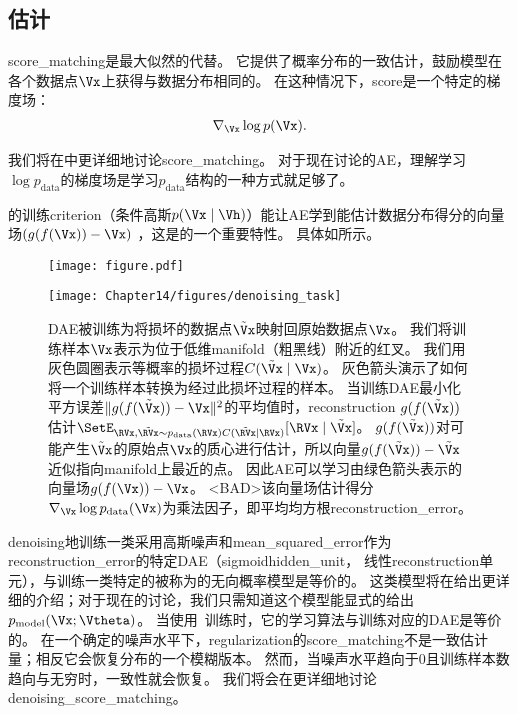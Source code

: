 
\subsection{估计}
\label{sec:estimating_the_score}
\gls{score_matching}\citep{Hyvarinen-2005}是最大似然的代替。
它提供了概率分布的一致估计，鼓励模型在各个数据点$\Vx$上获得与数据分布相同的。
在这种情况下，\gls{score}是一个特定的梯度场：
\begin{align}
 \nabla_{\Vx} \log p(\Vx) .
\end{align}

我们将在中更详细地讨论\gls{score_matching}。
对于现在讨论的\gls{AE}，理解学习$\log p_{\text{data}}$的梯度场是学习$p_{\text{data}}$结构的一种方式就足够了。


的训练\gls{criterion}（条件高斯$p(\Vx \mid \Vh)$）能让\gls{AE}学到能估计数据分布得分的向量场$(g(f(\Vx))-\Vx)$ ，这是的一个重要特性。
具体如所示。

\begin{figure}[!htb]
\ifOpenSource
\centerline{\texttt{[image: figure.pdf]}}
\else
\centerline{\texttt{[image: Chapter14/figures/denoising\_task]}}
\fi
\caption{\gls{DAE}被训练为将损坏的数据点$\tilde \Vx$映射回原始数据点$\Vx$。
我们将训练样本$\Vx$表示为位于低维\gls{manifold}（粗黑线）附近的红叉。
我们用灰色圆圈表示等概率的损坏过程$C(\tilde \Vx \mid \Vx)$。
灰色箭头演示了如何将一个训练样本转换为经过此损坏过程的样本。
当训练\gls{DAE}最小化平方误差$\| g(f(\tilde \Vx)) - \Vx \|^2$的平均值时，\gls{reconstruction} $g(f(\tilde \Vx))$估计$\SetE_{\RVx, \tilde{\RVx} \sim p_{\text{data}}(\RVx) C(\tilde{\RVx} \mid \RVx)}[\RVx \mid \tilde{\Vx}]$。
$g(f(\tilde \Vx))$对可能产生$\tilde \Vx$的原始点$\Vx$的质心进行估计，所以向量$ g(f(\tilde \Vx)) - \tilde \Vx $近似指向\gls{manifold}上最近的点。
因此\gls{AE}可以学习由绿色箭头表示的向量场$ g(f( \Vx)) -  \Vx $。
<BAD>该向量场估计得分$\nabla_{\Vx} \log p_{\text{data}}(\Vx)$为乘法因子，即平均均方根\gls{reconstruction_error}。
}
\label{fig:chap14_denoising_task}
\end{figure}

\gls{denoising}地训练一类采用高斯噪声和\gls{mean_squared_error}作为\gls{reconstruction_error}的特定\gls{DAE}（sigmoid\gls{hidden_unit}， 线性\gls{reconstruction}单元），与训练一类特定的被称为的无向概率模型是等价的\citep{Vincent-NC-2011-small}。
这类模型将在给出更详细的介绍；对于现在的讨论，我们只需知道这个模型能显式的给出$p_{\text{model}}(\Vx; \Vtheta)$。
当使用~\citep{Kingma+LeCun-2010-small}训练时，它的学习算法与训练对应的\gls{DAE}是等价的。
在一个确定的噪声水平下，\gls{regularization}的\gls{score_matching}不是一致估计量；相反它会恢复分布的一个模糊版本。
然而，当噪声水平趋向于0且训练样本数趋向与无穷时，一致性就会恢复。
我们将会在更详细地讨论\gls{denoising_score_matching}。


